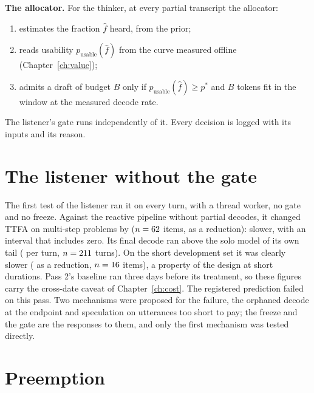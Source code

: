 \textbf{The allocator.} For the thinker, at every partial transcript the
allocator:
\begin{enumerate}
\item estimates the fraction $\hat f$ heard, from the prior;
\item reads usability $p_{\mathrm{usable}}(\hat f)$ from the curve measured
  offline (Chapter~\ref{ch:value});
\item admits a draft of budget $B$ only if $p_{\mathrm{usable}}(\hat f) \ge
  p^\ast$ and $B$ tokens fit in the window at the measured decode rate.
\end{enumerate}
The listener's gate runs independently of it. Every decision is logged with
its inputs and its reason.

\section{The listener without the gate}
\label{sec:pass2}

The first test of the listener ran it on every turn, with a thread worker,
no gate and no freeze. Against the reactive pipeline without partial decodes,
it changed TTFA on multi-step problems by \PtwoCI{} ($n=62$ items, as a
reduction): slower, with an interval that includes zero. Its final decode ran
above the solo model of its own tail
(\PtwoSix{} per turn, $n=211$ turns).
On the short development set it was clearly slower
(\PtwoDev{} as a reduction, $n=16$ items), a property of the design
at short durations. Pass 2's baseline ran three days before its treatment,
so these figures carry the cross-date caveat of Chapter~\ref{ch:cost}. The registered prediction failed on this pass. Two
mechanisms were proposed for the failure, the orphaned decode at the endpoint
and speculation on utterances too short to pay; the freeze and the gate are
the responses to them, and only the first mechanism was tested directly.

\section{Preemption}
\label{sec:preemption}

